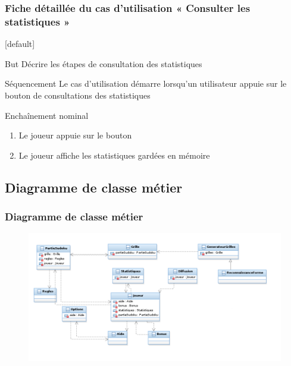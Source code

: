 \documentclass{beamer}
\begin{document}
\begin{frame}
  \frametitle{Fiche détaillée du cas d'utilisation « Consulter les statistiques »}
  [default]
  \begin{block}{\footnotesize{But}}
\scriptsize{Décrire les étapes de consultation des statistiques}
  \end{block}
  \pause
  \begin{block}{\footnotesize{Séquencement}}
\scriptsize{Le cas d'utilisation démarre lorsqu’un utilisateur appuie sur le bouton de consultations des statistiques}
  \end{block}
  \pause
  \begin{block}{\footnotesize{Enchaînement nominal}}
    \begin{enumerate}    
      [circle]
    \item
      \scriptsize{Le joueur appuie sur le bouton}
    \item
      \scriptsize{Le joueur affiche les statistiques gardées en mémoire}
    \end{enumerate}
\pause 
 \end{block}
\end{frame}


\subsection{Diagramme de classe métier}
\begin{frame}
  \frametitle{Diagramme de classe métier}
  \begin{figure}[h]
    \includegraphics[scale=0.4]{diagrammeDeClasseMetier.png}
\end{figure}
\end{frame}
\end{document}
